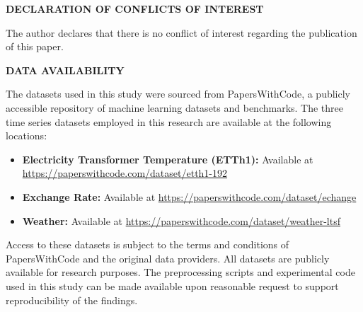 \documentclass{article}
\begin{document}
\newpage

\begin{center}
\Large\textbf{DECLARATION OF CONFLICTS OF INTEREST}
\end{center}

\vspace{1em}

The author declares that there is no conflict of interest regarding the publication of this paper.

\newpage

\begin{center}
\Large\textbf{DATA AVAILABILITY}
\end{center}

\vspace{1em}

The datasets used in this study were sourced from PapersWithCode, a publicly accessible repository of machine learning datasets and benchmarks. The three time series datasets employed in this research are available at the following locations:

\begin{itemize}
    \item \textbf{Electricity Transformer Temperature (ETTh1):} Available at \url{https://paperswithcode.com/dataset/etth1-192}
    \item \textbf{Exchange Rate:} Available at \url{https://paperswithcode.com/dataset/echange}
    \item \textbf{Weather:} Available at \url{https://paperswithcode.com/dataset/weather-ltsf}
\end{itemize}

Access to these datasets is subject to the terms and conditions of PapersWithCode and the original data providers. All datasets are publicly available for research purposes. The preprocessing scripts and experimental code used in this study can be made available upon reasonable request to support reproducibility of the findings.

\newpage
\printbibliography
\end{document}
